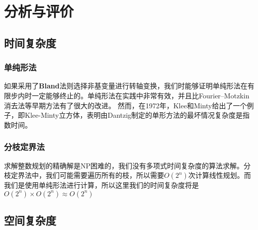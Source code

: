 \chapter{分析与评价}
\section{时间复杂度}
\subsection{单纯形法}
如果采用了\textbf{Bland}法则选择非基变量进行转轴变换，我们时能够证明单纯形法在有限步内时一定能够终止的。单纯形法在实践中非常有效，并且比Fourier–Motzkin消去法\cite{Fourier}等早期方法有了很大的改进。 然而，在1972年，Klee和Minty\cite{EXP}给出了一个例子，即Klee-Minty立方体，表明由Dantzig制定的单形方法的最坏情况复杂度是指数时间。

\subsection{分枝定界法}
求解整数规划的精确解是NP困难的，我们没有多项式时间复杂度的算法求解。分枝定界法中，我们可能需要遍历所有的枝，所以需要$O(2^n)$次计算线性规划。而我们是使用单纯形法进行计算，所以这里我们的时间复杂度将是$O(2^n)\times O(2^n) \approx O(2^n)​$

\section{空间复杂度}
